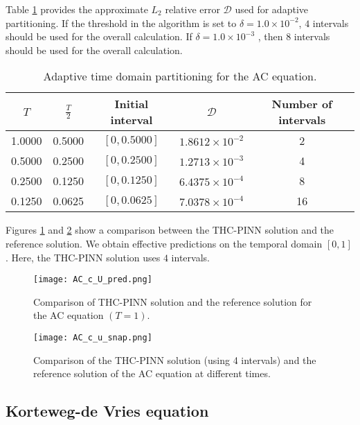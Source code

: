 \documentclass[preprint]{elsarticle}
\numberwithin{table}{section}
\numberwithin{equation}{section}
\numberwithin{figure}{section}
\begin{document}
\begin{CJK}{UTF8}{gbsn}
Table \ref{AC_adaTTT} provides the approximate $L_2$
  relative error $\mathcal{D}$ used for adaptive partitioning. If the threshold in the algorithm is set to $\delta=1.0\times10^{-2}$,  $4$ intervals should be used for the overall calculation. If $\delta=1.0\times10^{-3}$
 , then $8$ intervals should be used for the overall calculation.
\begin{table}[htbp]
    \centering
    \begin{tabular}{ccccc}
        \hline
  $T$ & $\frac{T}{2}$ &  Initial interval & $\mathcal{D}$ &Number of intervals\\ 
        \hline
1.0000 & 0.5000& $[0,0.5000]$ &$1.8612 \times 10^{-2}$  &2\\
0.5000&0.2500 & $[0,0.2500]$ & $1.2713 \times 10^{-3} $&4 \\
0.2500&0.1250& $[0,0.1250]$& $6.4375 \times 10^{-4}$&8 \\
0.1250&0.0625 & $[0,0.0625]$ & $7.0378 \times 10^{-4}$ &16\\
        \hline
    \end{tabular}
    \caption{Adaptive time  domain partitioning for the AC equation.}
    \label{AC_adaTTT}
\end{table}

Figures \ref{AC_c1} and \ref{AC_c2} show a comparison between the THC-PINN solution and the reference solution. We  obtain effective predictions on the temporal domain  $[0,1]$. Here, the THC-PINN solution uses $4$  intervals.
 



\begin{figure}[htbp]
\centering
\texttt{[image: AC\_c\_U\_pred.png]}
\caption{
Comparison of THC-PINN solution and the reference solution for the AC equation
$(T=1)$.}
\label{AC_c1}
\end{figure}


\begin{figure}[htbp]
\centering
\texttt{[image: AC\_c\_u\_snap.png]}
\caption{
Comparison of the THC-PINN solution (using 4 intervals) and the reference solution of the
AC equation at different times.}
\label{AC_c2}
\end{figure}




\subsection{Korteweg-de Vries 
 equation}\label{sec:KdV equation}



\end{CJK}
\end{document}

